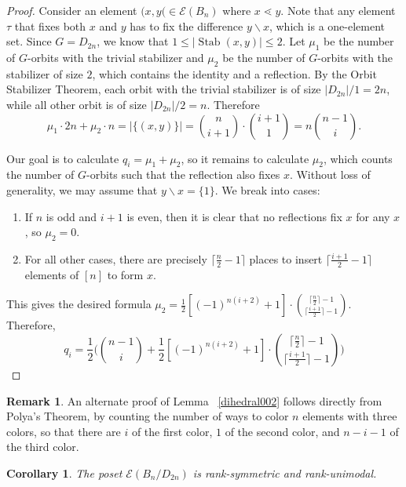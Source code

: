 \documentclass[10 pt]{amsart}
\theoremstyle{plain}
\newtheorem{cor}[thm]{Corollary}
\theoremstyle{definition}
\newtheorem{rem}[thm]{Remark}
\theoremstyle{remark}
\numberwithin{equation}{section}
\newcommand{\minus}{\backslash}
\newcommand{\dstyle}{\displaystyle}
\def\Stab{\operatorname{Stab}}
\begin{document}
\begin{proof}
Consider an element $(x , y( \in \mathcal E(B_n)$ where $x \lessdot y$. Note that any element $\tau $ that fixes both $x$ and $y$ has to fix the difference $y\minus x$, which is a one-element set. Since $G = D_{2n}$, 
we know that $1\leq |\Stab (x , y)| \leq 2$.   
Let $\mu_1$ be the number of $G$-orbits with the trivial stabilizer and $\mu_2$ be the number of $G$-orbits with the stabilizer of size $2$, which contains the identity and a reflection. By the Orbit Stabilizer Theorem, each orbit with the trivial stabilizer is of size $|D_{2n}| /1 = 2n $, while all other orbit is of size $|D_{2n}|/2 = n$.  Therefore $$\mu_1 \cdot 2n + \mu_2 \cdot n = |\{(x, y)\}| = {n \choose {i+1}}  \cdot {{i+1} \choose 1} = n {n-1 \choose i }.$$

Our goal is to calculate $q_i = \mu_1 + \mu_2$, so it remains to calculate $\mu_2$, which counts the number of $G$-orbits such that the reflection also fixes $x$. Without loss of generality, we may assume that $y\minus x = \{1\}$. 
We break into cases:
\begin{enumerate}
\item If $n$ is odd and $i+1$ is even, then it is clear that no reflections fix $x$ for any $x$, so $\mu_2=0$. 
\item For all other cases, there are precisely $\lceil \frac n 2 -1\rceil$ places to insert $\lceil \frac {i+1} 2 - 1 \rceil$ elements of $[n]$ to form $x$. 
\end{enumerate}
This gives the desired formula $\dstyle \mu_2 =  \frac{1}{2} [(-1)^{n(i+2)}+1] \cdot { \lceil \frac n 2\rceil -1  \choose \lceil \frac{i+1} 2 \rceil - 1}   $. Therefore, 
$$q_i = \frac{1}{2} \Big( {n-1 \choose i } + \frac{1}{2} [(-1)^{n(i+2)}+1] \cdot { \lceil \frac n 2\rceil -1  \choose \lceil \frac{i+1} 2 \rceil - 1}    \Big)$$
\end{proof}
\begin{rem}
An alternate proof of Lemma ~\ref{dihedral002} follows directly from Polya's Theorem, by counting the number of ways to color $n$ elements with three colors, so that there are $i$ of the first color, $1$ of the second color, and $n-i-1$ of the third color.
\end{rem}


\begin{cor}{\label{dihedral003}} 
The poset $\mathcal E(B_n/D_{2n})$ is rank-symmetric and rank-unimodal.
\end{cor}
\end{document}
